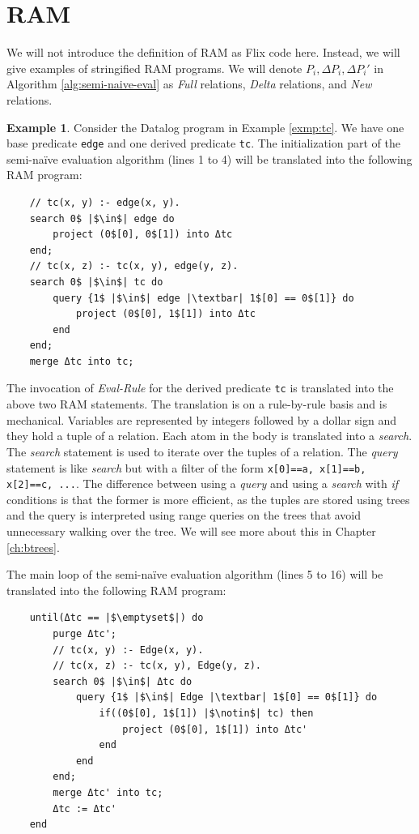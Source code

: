 \documentclass[twoside,11pt,openright]{report}
\theoremstyle{definition}
\newtheorem{exmp}{Example}[chapter]
\begin{document}
\section{RAM}

We will not introduce the definition of RAM as Flix code here. Instead, we will give examples of stringified RAM programs. We will denote $P_i, \Delta P_i, \Delta P_i'$ in Algorithm \ref{alg:semi-naive-eval} as \textit{Full} relations, \textit{Delta} relations, and \textit{New} relations.

\begin{exmp}
  Consider the Datalog program in Example \ref{exmp:tc}. We have one base predicate \texttt{edge} and one derived predicate \texttt{tc}. The initialization part of the semi-naïve evaluation algorithm (lines 1 to 4) will be translated into the following RAM program:
  \begin{verbatim}
    // tc(x, y) :- edge(x, y).
    search 0$ |$\in$| edge do
        project (0$[0], 0$[1]) into Δtc
    end;
    // tc(x, z) :- tc(x, y), edge(y, z).
    search 0$ |$\in$| tc do
        query {1$ |$\in$| edge |\textbar| 1$[0] == 0$[1]} do
            project (0$[0], 1$[1]) into Δtc
        end
    end;
    merge Δtc into tc;
  \end{verbatim}
  The invocation of \textit{Eval-Rule} for the derived predicate \texttt{tc} is translated into the above two RAM statements. The translation is on a rule-by-rule basis and is mechanical. Variables are represented by integers followed by a dollar sign and they hold a tuple of a relation. Each atom in the body is translated into a \textit{search}. The \textit{search} statement is used to iterate over the tuples of a relation. The \textit{query} statement is like \textit{search} but with a filter of the form \texttt{x[0]==a, x[1]==b, x[2]==c, ...}. The difference between using a \textit{query} and using a \textit{search} with \textit{if} conditions is that the former is more efficient, as the tuples are stored using trees and the query is interpreted using range queries on the trees that avoid unnecessary walking over the tree. We will see more about this in Chapter \ref{ch:btrees}.

  The main loop of the semi-naïve evaluation algorithm (lines 5 to 16) will be translated into the following RAM program:
  \begin{verbatim}
    until(Δtc == |$\emptyset$|) do
        purge Δtc';
        // tc(x, y) :- Edge(x, y).
        // tc(x, z) :- tc(x, y), Edge(y, z).
        search 0$ |$\in$| Δtc do
            query {1$ |$\in$| Edge |\textbar| 1$[0] == 0$[1]} do
                if((0$[0], 1$[1]) |$\notin$| tc) then
                    project (0$[0], 1$[1]) into Δtc'
                end
            end
        end;
        merge Δtc' into tc;
        Δtc := Δtc'
    end
  \end{verbatim}


\end{exmp}
\end{document}
